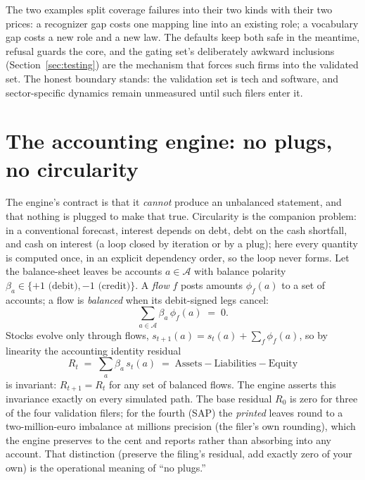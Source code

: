 \documentclass[11pt]{article}
\begin{document}
The two examples split coverage failures into their two kinds with their two prices: a recognizer gap costs one mapping line into an existing role; a vocabulary gap costs a new role and a new law. The defaults keep both safe in the meantime, refusal guards the core, and the gating set's deliberately awkward inclusions (Section~\ref{sec:testing}) are the mechanism that forces such firms into the validated set. The honest boundary stands: the validation set is tech and software, and sector-specific dynamics remain unmeasured until such filers enter it.

\section{The accounting engine: no plugs, no circularity}
\label{sec:engine}
The engine's contract is that it \emph{cannot} produce an unbalanced statement, and that nothing is plugged to make that true. Circularity is the companion problem: in a conventional forecast, interest depends on debt, debt on the cash shortfall, and cash on interest (a loop closed by iteration or by a plug); here every quantity is computed once, in an explicit dependency order, so the loop never forms. Let the balance-sheet leaves be accounts $a \in \mathcal{A}$ with balance polarity $\beta_a \in \{+1 \text{ (debit)}, -1 \text{ (credit)}\}$. A \emph{flow} $f$ posts amounts $\phi_f(a)$ to a set of accounts; a flow is \emph{balanced} when its debit-signed legs cancel:
\begin{equation}
\sum_{a \in \mathcal{A}} \beta_a\, \phi_f(a) \;=\; 0 .
\label{eq:balanced}
\end{equation}
Stocks evolve only through flows, $s_{t+1}(a) = s_t(a) + \sum_f \phi_f(a)$, so by linearity the accounting identity residual
\begin{equation}
R_t \;=\; \sum_{a} \beta_a\, s_t(a) \;=\; \text{Assets} - \text{Liabilities} - \text{Equity}
\end{equation}
is invariant: $R_{t+1} = R_t$ for any set of balanced flows. The engine asserts this invariance exactly on every simulated path. The base residual $R_0$ is zero for three of the four validation filers; for the fourth (SAP) the \emph{printed} leaves round to a two-million-euro imbalance at millions precision (the filer's own rounding), which the engine preserves to the cent and reports rather than absorbing into any account. That distinction (preserve the filing's residual, add exactly zero of your own) is the operational meaning of ``no plugs.''
\end{document}
